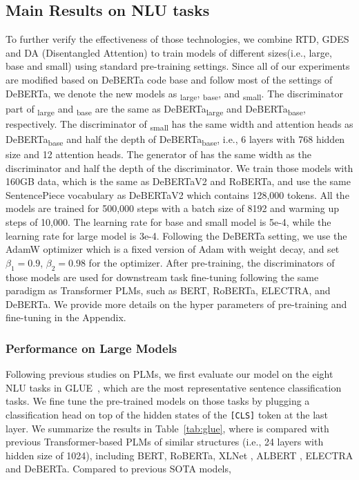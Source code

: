 \subsection{Main Results on NLU tasks}
\label{subsec:main}
To further verify the effectiveness of those technologies, we combine RTD, GDES and DA (Disentangled Attention) to train models of different sizes(i.e., large, base and small) using standard pre-training settings. Since all of our experiments are modified based on DeBERTa code base and follow most of the settings of DeBERTa, we denote the new models as {\ModelName}\textsubscript{large}, {\ModelName}\textsubscript{base}, and {\ModelName}\textsubscript{small}. The discriminator part of {\ModelName}\textsubscript{large} and {\ModelName}\textsubscript{base} are the same as DeBERTa\textsubscript{large} and DeBERTa\textsubscript{base}, respectively. The discriminator of {\ModelName}\textsubscript{small} has the same width and attention heads as DeBERTa\textsubscript{base} and half the depth of DeBERTa\textsubscript{base}, i.e., 6 layers with 768 hidden size and 12 attention heads. The generator  of {\ModelName} has the same width as the discriminator and half the depth of the discriminator. We train those models with 160GB data, which is the same as DeBERTaV2 and RoBERTa, and use the same SentencePiece \citep{kudo2018subword, sennrich-etal-2016-neural} vocabulary as DeBERTaV2 \citep{he2020deberta} which contains 128,000 tokens. All the models are trained for 500,000 steps with a batch size of 8192 and warming up steps of 10,000. The learning rate for base and small model is 5e-4, while the learning rate for large model is 3e-4. Following the DeBERTa setting, we use the  AdamW \citep{loshchilov2018fixing} optimizer which is a fixed version of Adam \citep{kingma2014adam} with weight decay, and set  $\beta_1=0.9$, $\beta_2=0.98$ for the optimizer. After pre-training, the discriminators  of those models are used for downstream task fine-tuning following the same paradigm as Transformer PLMs, such as  BERT, RoBERTa, ELECTRA, and DeBERTa. We provide more details on the hyper parameters of pre-training and fine-tuning in the Appendix. 

\subsubsection{Performance on Large Models}
\label{exp:large}

Following previous studies on PLMs, we first evaluate our model on the eight NLU tasks in GLUE~\citep{wang2018glue}, which are the most representative sentence classification tasks. We fine tune the pre-trained models on those tasks by plugging a classification head on top of the hidden states of the \texttt{[CLS]} token at the last layer. We summarize the results in Table~\ref{tab:glue}, where {\ModelName} is compared  with previous Transformer-based PLMs of similar structures (i.e., 24 layers with hidden size of 1024), including BERT, RoBERTa, XLNet \citep{yang2019xlnet}, ALBERT \citep{lan2019albert}, ELECTRA and DeBERTa. Compared to previous SOTA models,  

